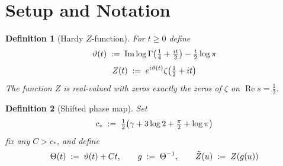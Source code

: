 \documentclass{amsart}
\newcommand{\assign}{:=}
\newcommand{\tmop}[1]{\ensuremath{\operatorname{#1}}}
\newtheorem{definition}{Definition}
\newcommand{\Ima}{\tmop{Im}}
\newcommand{\Rea}{\tmop{Re}}
\begin{document}
\section{Setup and Notation}

\begin{definition}
  [Hardy $Z$-function]\label{def:Z} For $t \ge 0$ define
  \begin{equation}
    \vartheta (t) \hspace{0.27em} \assign \hspace{0.27em} \Ima \log \Gamma
    \hspace{-0.17em} \left( \tfrac{1}{4} + \tfrac{it}{2} \right) -
    \tfrac{t}{2} \log \pi
  \end{equation}
  \begin{equation}
    Z (t) \hspace{0.27em} \assign \hspace{0.27em} e^{i \vartheta (t)} \zeta
    \hspace{-0.17em} \left( \tfrac{1}{2} + it \right)
  \end{equation}
  The function $Z$ is real-valued with zeros exactly the zeros of $\zeta$ on
  $\Rea s = \tfrac{1}{2}$.
\end{definition}

\begin{definition}
  [Shifted phase map]\label{def:Theta} Set
  \begin{equation}
    c_{\ast} \hspace{0.27em} \assign \hspace{0.27em} \tfrac{1}{2}
    \hspace{-0.17em} \left( \gamma + 3 \log 2 + \tfrac{\pi}{2} + \log \pi
    \right)
  \end{equation}
  fix any $C > c_{\ast}$, and define
  \begin{equation}
    \Theta (t) \hspace{0.27em} \assign \hspace{0.27em} \vartheta (t) + Ct,
    \qquad g \hspace{0.27em} \assign \hspace{0.27em} \Theta^{- 1}, \qquad
    \tilde{Z} (u) \hspace{0.27em} \assign \hspace{0.27em} Z (g (u))
  \end{equation}
\end{definition}
\end{document}
